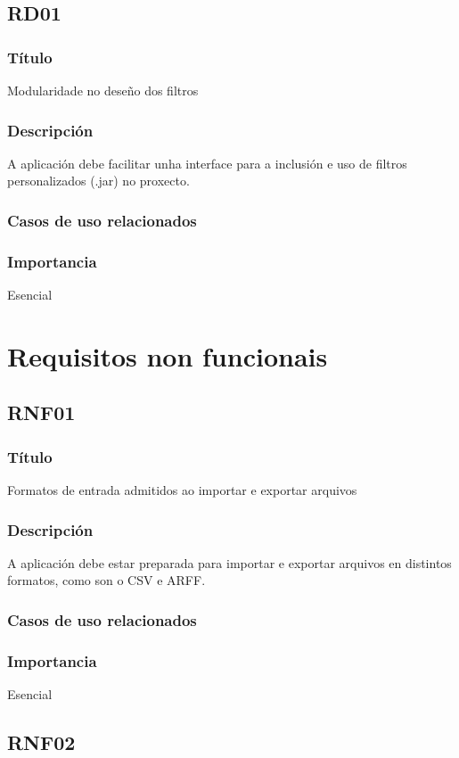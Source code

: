 \subsection*{RD01}
\subsubsection{Título}
Modularidade no deseño dos filtros
\subsubsection{Descripción}
A aplicación debe facilitar unha interface para a inclusión e uso de filtros personalizados (.jar) no proxecto.
\subsubsection{Casos de uso relacionados}
\subsubsection{Importancia}
Esencial

\section{Requisitos non funcionais}

\subsection*{RNF01}
\subsubsection{Título}
Formatos de entrada admitidos ao importar e exportar arquivos
\subsubsection{Descripción}
A aplicación debe estar preparada para importar e exportar arquivos en distintos formatos, como son o CSV e ARFF.
\subsubsection{Casos de uso relacionados}
\subsubsection{Importancia}
Esencial

\subsection*{RNF02}
